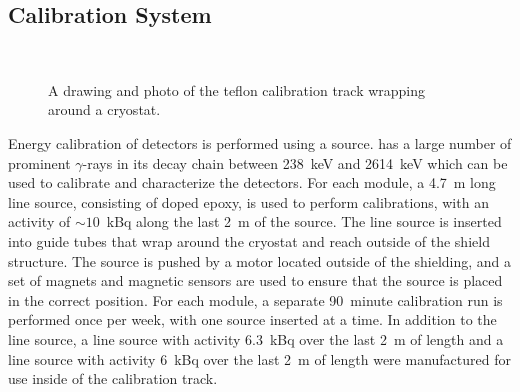 \documentclass[/main.tex]{subfiles}
\begin{document}
\subsection{Calibration System}
\begin{figure}
  \centering
  ~
  \caption[Calibration track]{\label{fig:caltrack}
    A drawing and photo of the teflon calibration track wrapping around a cryostat.
  }
\end{figure}
Energy calibration of detectors is performed using a  source\cite{mjdcalibration}.
 has a large number of prominent $\gamma$-rays in its decay chain between 238~keV and 2614~keV which can be used to calibrate and characterize the detectors.
For each module, a 4.7~m long line source, consisting of  doped epoxy, is used to perform calibrations, with an activity of $\sim10$~kBq along the last 2~m of the source.
The line source is inserted into guide tubes that wrap around the cryostat and reach outside of the shield structure.
The source is pushed by a motor located outside of the shielding, and a set of magnets and magnetic sensors are used to ensure that the source is placed in the correct position.
For each module, a separate 90~minute calibration run is performed once per week, with one source inserted at a time.
In addition to the  line source, a  line source with activity 6.3~kBq over the last 2~m of length and a  line source with activity 6~kBq over the last 2~m of length were manufactured for use inside of the calibration track.
\end{document}
